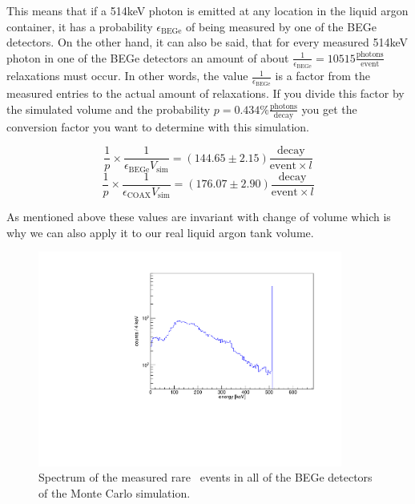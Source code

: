 \documentclass[encoding=utf8,british]{tumphthesis}
\begin{document}
This means that if a 514keV photon is emitted at any location in the liquid argon container, it has a probability \(\epsilon_{\mathrm{BEGe}}\) of being measured by one of the BEGe detectors.
On the other hand, it can also be said, that for every measured 514keV photon in one of the BEGe detectors an amount of about $\frac{1}{\epsilon_{\mathrm{BEGe}}} = 10515 \frac{\mathrm{photons}}{\mathrm{event}}$  relaxations must occur.
In other words, the value $\frac{1}{\epsilon_{\mathrm{BEGe}}}$ is a factor from the measured entries to the actual amount of  relaxations.
If you divide this factor by the simulated volume and the probability $p=0.434\% \frac{\mathrm{photons}}{\mathrm{decay}}$ you get the conversion factor you want to determine with this simulation.

\begin{equation*}
\frac{1}{p}\times\frac{1}{\epsilon_{\mathrm{BEGe}} V_{\mathrm{sim}}} = (144.65\pm2.15) \frac{\mathrm{decay}}{\mathrm{event} \times l}
\end{equation*}
\begin{equation*}
\frac{1}{p}\times\frac{1}{\epsilon_{\mathrm{COAX}} V_{\mathrm{sim}}} = (176.07\pm2.90) \frac{\mathrm{decay}}{\mathrm{event} \times l}
\end{equation*}

As mentioned above these values are invariant with change of volume which is why we can also apply it to our real liquid argon tank volume. 
\\

\begin{figure}[t!]
	\centering
	\ifmakefigures%
	\includegraphics[width=100mm]{./Bilder/MC-514-Phasenraum.pdf}
	\fi%
	\caption{
    Spectrum of the measured rare \Kr\ events in all of the BEGe detectors of the Monte Carlo simulation.
	}
	\label{fig:PhasenraumMC514}
\end{figure}
\end{document}
